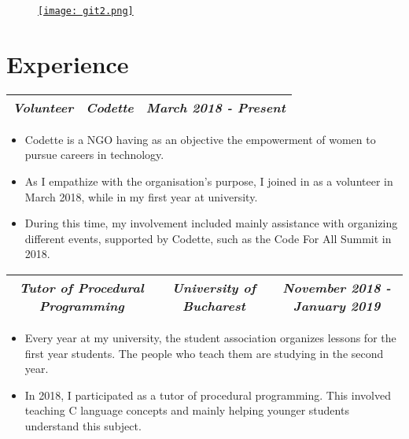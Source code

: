\documentclass[11px]{article}
\begin{document}
    
    \begin{figure}[!htb]        
        \begin{minipage}{0.05\textwidth}
            \href{https://www.github.com/BogdanVM} {\texttt{[image: git2.png]} }
        \end{minipage}
    \end{figure}
    
    
    \section*{ Experience }
        \setlength{\tabcolsep}{55pt}
        \begin{tabular} {ccc}
            \small\textit{\textbf{Volunteer}} 
            & \small\textit{\textbf{Codette}} 
            & \small\textit{\textbf{March 2018 - Present}}\\
            \hline
        \end{tabular}

        \begin{itemize}
            \item Codette is a NGO having as an objective the empowerment of women to pursue careers in technology.
            \item As I empathize with the organisation's purpose, I joined in as a volunteer in March 2018, while in my first year at university.
            \item During this time, my involvement included mainly assistance with organizing different events, supported by Codette, such as the Code For All Summit in 2018.
        \end{itemize}

        \setlength{\tabcolsep}{15pt}
        \begin{tabular} {ccc}
            \small\textit{\textbf{Tutor of Procedural Programming}} 
            & \small\textit{\textbf{University of Bucharest}} 
            & \small\textit{\textbf{November 2018 - January 2019}}\\
            \hline
        \end{tabular}

        \begin{itemize}
            \item Every year at my university, the student association organizes lessons for the first year students. The people who teach them are studying in the second year.
            \item In 2018, I participated as a tutor of procedural programming. This involved teaching C language concepts and mainly helping younger students understand this subject.
        \end{itemize}
    
\end{document}
